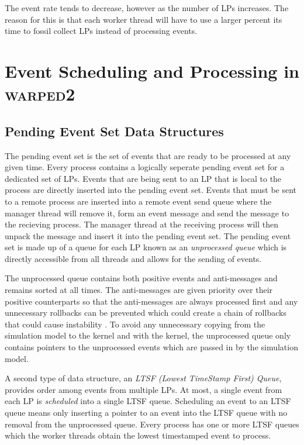 \documentclass[11pt]{book}
\begin{document}
The event rate tends to decrease, however as the number of LPs increases.  The reason for this
is that each worker thread will have to use a larger percent its time to fossil collect LPs
instead of processing events.



\chapter[Event Scheduling]{Event Scheduling and Processing in \textsc{warped2}}\label{warped2_ds}

\section{Pending Event Set Data Structures}

The pending event set is the set of events that are ready to be processed at any given time.
Every process contains a logically seperate pending event set for a dedicated set of LPs.  Events
that are being sent to an LP that is local to the process are directly inserted into the pending
event set.  Events that must be sent to a remote process are inserted into a remote event send
queue where the manager thread will remove it, form an event message and send the message to
the recieving process.  The manager thread at the receiving process will then unpack the message
and insert it into the pending event set.  The pending event set is made up of a queue for each
LP known as an \emph{unprocessed queue} which is directly accessible from all threads and allows
for the sending of events.

The unprocessed queue contains both positive events and anti-messages and remains sorted at all
times.  The anti-messages are given priority over their positive counterparts so that the
anti-messages are always processed first and any unnecessary rollbacks can be prevented which
could create a chain of rollbacks that could cause instability \cite{lubachevsky-89}.  To avoid
any unnecessary copying from the simulation model to the kernel and with the kernel, the
unprocessed queue only contains pointers to the unprocessed events which are passed in by the
simulation model.

A second type of data structure, an \emph{LTSF (Lowest TimeStamp First) Queue}, provides
order among events from multiple LPs.  At most, a single event from each LP is \emph{scheduled}
into a single LTSF queue.  Scheduling an event to an LTSF queue means only inserting a pointer
to an event into the LTSF queue with no removal from the unprocessed queue.  Every process has
one or more LTSF queues which the worker threads obtain the lowest timestamped event to process.
\end{document}
